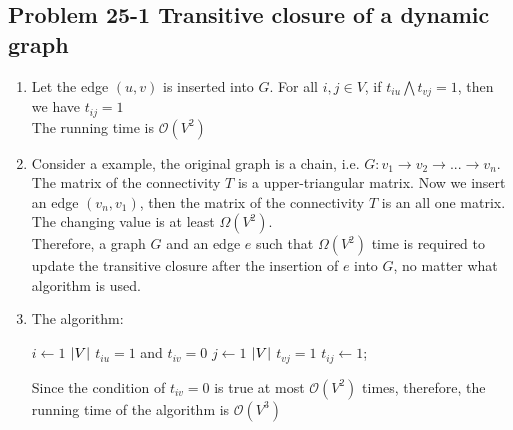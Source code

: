 \subsection*{Problem 25-1 Transitive closure of a dynamic graph}
\begin{enumerate}
	\item	Let the edge $(u, v)$ is inserted into $G$. For all $i, j \in V$, if $t_{iu} \bigwedge t_{vj} = 1$, then we have $t_{ij} = 1$ \\
		The running time is $\mathcal{O}(V^2)$
	\item	Consider a example, the original graph is a chain, i.e. $G: v_1 \rightarrow v_2 \rightarrow ... \rightarrow v_n$. The matrix of the connectivity $T$ is a upper-triangular matrix. Now we insert an edge $(v_n, v_1)$, then the matrix of the connectivity $T$ is an all one matrix. The changing value is at least $\Omega(V^2)$. \\
		Therefore, a graph $G$ and an edge $e$ such that $\Omega(V^2)$ time is required to update the transitive closure after the insertion of $e$ into $G$, no matter what algorithm is used.
	\item	The algorithm:
		\begin{codebox}
		\li	\For $i \gets 1$ \To $\left\lvert V \right\rvert$
			\Do
		\li		\If $t_{iu} = 1$ and $t_{iv} = 0$
				\Then
		\li			\For $j \gets 1$ \To $\left\lvert V \right\rvert$
					\Do
		\li				\If $t_{vj} = 1$
						\Then
		\li					$t_{ij} \gets 1$;
						\End
					\End
				\End
			\End
		
		\end{codebox}
		Since the condition of $t_{iv} = 0$ is true at most $\mathcal{O}(V^2)$ times, therefore, the running time of the algorithm is $\mathcal{O}(V^3)$
\end{enumerate}

